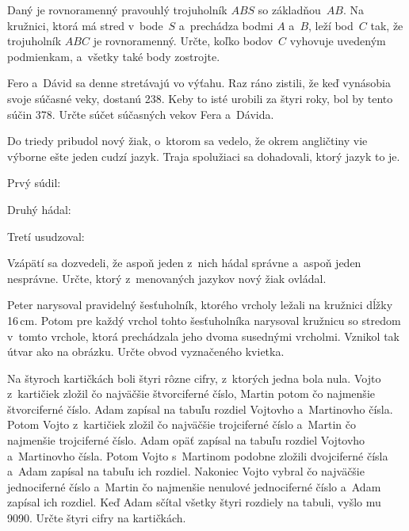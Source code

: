 {%
Daný je rovnoramenný pravouhlý trojuholník $ABS$ so základňou~$AB$. Na kružnici, ktorá má stred v~bode~$S$ a~prechádza bodmi $A$ a~$B$, leží bod~$C$ tak, že trojuholník $ABC$ je rovnoramenný. Určte, koľko bodov~$C$ vyhovuje uvedeným podmienkam, a~všetky také body zostrojte.}

{%
Fero a~Dávid sa denne stretávajú vo výťahu. Raz ráno zistili, že keď vynásobia svoje súčasné veky, dostanú 238. Keby to isté urobili za štyri roky, bol by tento súčin 378. Určte súčet súčasných vekov Fera a~Dávida.}

{%
Do triedy pribudol nový žiak, o~ktorom sa vedelo, že okrem angličtiny vie výborne ešte jeden cudzí jazyk. Traja spolužiaci sa dohadovali, ktorý jazyk to je.

Prvý súdil: 

Druhý hádal: 

Tretí usudzoval: 

Vzápätí sa dozvedeli, že aspoň jeden z~nich hádal správne a~aspoň jeden nesprávne. Určte, ktorý z~menovaných jazykov nový žiak ovládal.}

{%
Peter narysoval pravidelný šesťuholník, ktorého vrcholy ležali na kružnici dĺžky 16\,cm. Potom pre každý vrchol tohto šesťuholníka narysoval kružnicu so stredom v~tomto vrchole, ktorá prechádzala jeho dvoma susednými vrcholmi. Vznikol tak útvar ako na obrázku. Určte obvod vyznačeného kvietka.
%
}

{%
Na štyroch kartičkách boli štyri rôzne cifry, z~ktorých jedna bola nula. Vojto z~kartičiek zložil čo najväčšie štvorciferné číslo, Martin potom čo najmenšie štvorciferné číslo. Adam zapísal na tabuľu rozdiel Vojtovho a~Martinovho čísla. Potom Vojto z~kartičiek zložil čo najväčšie trojciferné číslo a~Martin čo najmenšie trojciferné číslo. Adam opäť zapísal na tabuľu rozdiel Vojtovho a~Martinovho čísla. Potom Vojto s~Martinom podobne zložili dvojciferné čísla a~Adam zapísal na tabuľu ich rozdiel. Nakoniec Vojto vybral čo najväčšie jednociferné číslo a~Martin čo najmenšie nenulové jednociferné číslo a~Adam zapísal ich rozdiel. Keď Adam sčítal všetky štyri rozdiely na tabuli, vyšlo mu 9090. Určte štyri cifry na kartičkách.}

